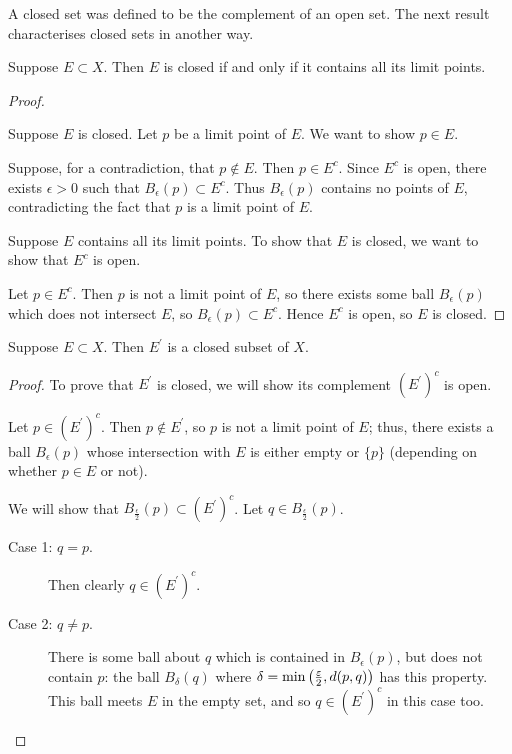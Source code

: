 A closed set was defined to be the complement of an open set. The next result characterises closed sets in another way.

\begin{lemma}\label{lemma:closed-contain-all-limit-points}
Suppose $E\subset X$. Then $E$ is closed if and only if it contains all its limit points.
\end{lemma}

\begin{proof} \

\forward Suppose $E$ is closed. Let $p$ be a limit point of $E$. We want to show $p\in E$.

Suppose, for a contradiction, that $p\notin E$. Then $p\in E^c$. Since $E^c$ is open, there exists $\epsilon>0$ such that $B_\epsilon(p)\subset E^c$. Thus $B_\epsilon(p)$ contains no points of $E$, contradicting the fact that $p$ is a limit point of $E$.

\backward Suppose $E$ contains all its limit points. To show that $E$ is closed, we want to show that $E^c$ is open.

Let $p\in E^c$. Then $p$ is not a limit point of $E$, so there exists some ball $B_\epsilon(p)$ which does not intersect $E$, so $B_\epsilon(p)\subset E^c$. Hence $E^c$ is open, so $E$ is closed.
\end{proof}

\begin{lemma}
Suppose $E\subset X$. Then $E^\prime$ is a closed subset of $X$.
\end{lemma}

\begin{proof}
To prove that $E^\prime$ is closed, we will show its complement $(E^\prime)^c$ is open.

Let $p\in (E^\prime)^c$. Then $p\notin E^\prime$, so $p$ is not a limit point of $E$; thus, there exists a ball $B_\epsilon(p)$ whose intersection with $E$ is either empty or $\{p\}$ (depending on whether $p\in E$ or not).

We will show that $B_\frac{\epsilon}{2}(p)\subset (E^\prime)^c$. 
Let $q\in B_\frac{\epsilon}{2}(p)$.

\begin{description}
\item[Case 1: $q=p$.] Then clearly $q\in (E^\prime)^c$.
\item[Case 2: $q\neq p$.] There is some ball about $q$ which is contained in $B_\epsilon(p)$, but does not contain $p$: the ball $B_\delta(q)$ where $\delta=\min\left(\frac{\varepsilon}{2},d(p,q)\right)$ has this property. This ball meets $E$ in the empty set, and so $q\in (E^\prime)^c$ in this case too.
\end{description}
\end{proof}


